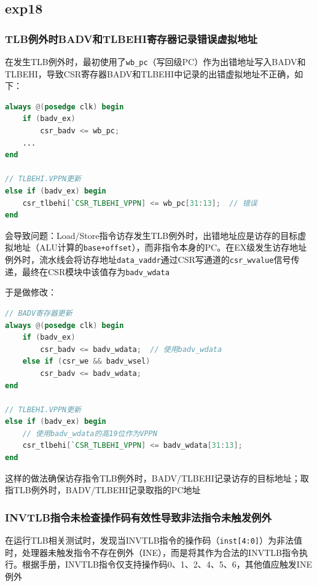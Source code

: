 \subsection{exp18}
\subsubsection{TLB例外时BADV和TLBEHI寄存器记录错误虚拟地址}

在发生TLB例外时，最初使用了\texttt{wb\_pc}（写回级PC）作为出错地址写入BADV和TLBEHI，导致CSR寄存器BADV和TLBEHI中记录的出错虚拟地址不正确，如下：


\begin{lstlisting}[language=Verilog]
always @(posedge clk) begin
    if (badv_ex)
        csr_badv <= wb_pc;
    ...
end

// TLBEHI.VPPN更新
else if (badv_ex) begin
    csr_tlbehi[`CSR_TLBEHI_VPPN] <= wb_pc[31:13];  // 错误
end
\end{lstlisting}

会导致问题：Load/Store指令访存发生TLB例外时，出错地址应是访存的目标虚拟地址（ALU计算的\texttt{base+offset}），而非指令本身的PC。在EX级发生访存地址例外时，流水线会将访存地址\texttt{data\_vaddr}通过CSR写通道的\texttt{csr\_wvalue}信号传递，最终在CSR模块中该值存为\texttt{badv\_wdata}

于是做修改：

\begin{lstlisting}[language=Verilog]
// BADV寄存器更新
always @(posedge clk) begin
    if (badv_ex)
        csr_badv <= badv_wdata;  // 使用badv_wdata
    else if (csr_we && badv_wsel)
        csr_badv <= badv_wdata;
end

// TLBEHI.VPPN更新
else if (badv_ex) begin
    // 使用badv_wdata的高19位作为VPPN
    csr_tlbehi[`CSR_TLBEHI_VPPN] <= badv_wdata[31:13];
end
\end{lstlisting}

这样的做法确保访存指令TLB例外时，BADV/TLBEHI记录访存的目标地址；取指TLB例外时，BADV/TLBEHI记录取指的PC地址

\subsubsection{INVTLB指令未检查操作码有效性导致非法指令未触发例外}

在运行TLB相关测试时，发现当INVTLB指令的操作码（\texttt{inst[4:0]}）为非法值时，处理器未触发指令不存在例外（INE），而是将其作为合法的INVTLB指令执行。根据手册，INVTLB指令仅支持操作码0、1、2、4、5、6，其他值应触发INE例外


